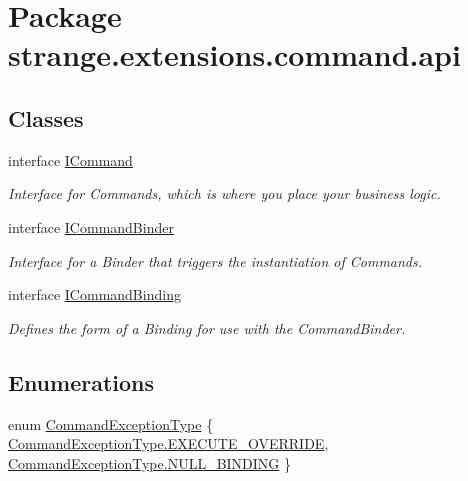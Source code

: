 \hypertarget{namespacestrange_1_1extensions_1_1command_1_1api}{\section{Package strange.\-extensions.\-command.\-api}
\label{namespacestrange_1_1extensions_1_1command_1_1api}
}
\subsection*{Classes}
\begin{DoxyCompactItemize}
\item 
interface \hyperlink{interfacestrange_1_1extensions_1_1command_1_1api_1_1_i_command}{I\-Command}
\begin{DoxyCompactList}\small\item\em Interface for Commands, which is where you place your business logic. \end{DoxyCompactList}\item 
interface \hyperlink{interfacestrange_1_1extensions_1_1command_1_1api_1_1_i_command_binder}{I\-Command\-Binder}
\begin{DoxyCompactList}\small\item\em Interface for a Binder that triggers the instantiation of Commands. \end{DoxyCompactList}\item 
interface \hyperlink{interfacestrange_1_1extensions_1_1command_1_1api_1_1_i_command_binding}{I\-Command\-Binding}
\begin{DoxyCompactList}\small\item\em Defines the form of a Binding for use with the Command\-Binder. \end{DoxyCompactList}\end{DoxyCompactItemize}
\subsection*{Enumerations}
\begin{DoxyCompactItemize}
\item 
enum \hyperlink{namespacestrange_1_1extensions_1_1command_1_1api_a27c9226cc8d55624f3294319d48879e3}{Command\-Exception\-Type} \{ \hyperlink{namespacestrange_1_1extensions_1_1command_1_1api_a27c9226cc8d55624f3294319d48879e3a649c27d7db043238f4e8ee0d1c8c52fc}{Command\-Exception\-Type.\-E\-X\-E\-C\-U\-T\-E\-\_\-\-O\-V\-E\-R\-R\-I\-D\-E}, 
\hyperlink{namespacestrange_1_1extensions_1_1command_1_1api_a27c9226cc8d55624f3294319d48879e3a35310c46c16e400ec14d3f312e93ec71}{Command\-Exception\-Type.\-N\-U\-L\-L\-\_\-\-B\-I\-N\-D\-I\-N\-G}
 \}
\end{DoxyCompactItemize}


